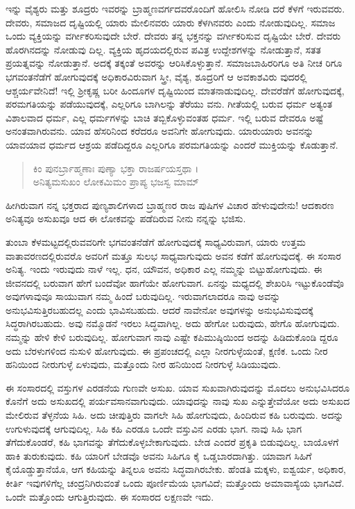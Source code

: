 ಇನ್ನು ವೈಶ್ಯರು ಮತ್ತು ಶೂದ್ರರು ಇವರನ್ನು ಬ್ರಾಹ್ಮಣವರ್ಗದವರೊಂದಿಗೆ ಹೋಲಿಸಿ ನೋಡಿ ದರೆ ಕೆಳಗೆ ಇರುವವರು. ದೇವರು, ಸಮಾಜದ ದೃಷ್ಟಿಯಲ್ಲಿ ಯಾರು ಮೇಲಿನವರು ಯಾರು ಕೆಳಗಿನವರು ಎಂದು ನೋಡುವುದಿಲ್ಲ. ಸಮಾಜ ಒಂದು ವ್ಯಕ್ತಿಯನ್ನು ವರ್ಗೀಕರಿಸುವುದೇ ಬೇರೆ. ದೇವರು ತನ್ನ ಭಕ್ತನನ್ನು ವರ್ಗೀಕರಿಸುವ ದೃಷ್ಟಿಯೇ ಬೇರೆ. ದೇವರು ಹೊರಗಿನದನ್ನು ನೋಡುವು ದಿಲ್ಲ. ವ್ಯಕ್ತಿಯ ಹೃದಯದಲ್ಲಿರುವ ಪವಿತ್ರ ಉದ್ದೇಶಗಳನ್ನು ನೋಡುತ್ತಾನೆ, ಸತತ ಪ್ರಯತ್ನವನ್ನು ನೋಡುತ್ತಾನೆ. ಅದಕ್ಕೆ ತಕ್ಕಂತೆ ಅವರನ್ನು ಆರಿಸಿಕೊಳ್ಳುತ್ತಾನೆ. ಸಮಾಜಬಾಹಿರರಿಗೂ ಅತಿ ನೀಚ ರಿಗೂ ಭಗವಂತನೆಡೆಗೆ ಹೋಗುವುದಕ್ಕೆ ಅಧಿಕಾರವಿರುವಾಗ ಸ್ತ್ರೀ, ವೈಶ್ಯ, ಶೂದ್ರರಿಗೆ ಆ ಅವಕಾಶವಿರು ವುದರಲ್ಲಿ ಆಶ್ಚರ್ಯವೇನಿದೆ! ಇಲ್ಲಿ ಶ್ರೀಕೃಷ್ಣ ಬರೀ ಹಿಂದೂಗಳ ದೃಷ್ಟಿಯಿಂದ ಮಾತನಾಡುವುದಿಲ್ಲ. ದೇವರೆಡೆಗೆ ಹೋಗುವುದಕ್ಕೆ, ಪರಮಗತಿಯನ್ನು ಪಡೆಯುವುದಕ್ಕೆ, ಎಲ್ಲರಿಗೂ ಬಾಗಿಲನ್ನು ತೆರೆಯು ವನು. ಗೀತೆಯಲ್ಲಿ ಬರುವ ಧರ್ಮ ಅತ್ಯಂತ ವಿಶಾಲವಾದ ಧರ್ಮ, ಎಲ್ಲ ಧರ್ಮಗಳನ್ನು ಬಾಚಿ ತಬ್ಬಿಕೊಳ್ಳುವಂತಹ ಧರ್ಮ. ಇಲ್ಲಿ ಬರುವ ದೇವರೂ ಅಷ್ಟೆ ಅನಂತವಾಗಿರುವನು. ಯಾವ ಹೆಸರಿನಿಂದ ಕರೆದರೂ ಅವನಿಗೇ ಹೋಗುವುದು. ಯಾರುಯಾರು ಅವನನ್ನು ಯಾವಯಾವ ಧರ್ಮದ ಆಶ್ರಯ ಪಡೆದಿದ್ದರೂ ಎಲ್ಲರಿಗೂ ಪರಮಗತಿಯನ್ನು ಎಂದರೆ ಮುಕ್ತಿಯನ್ನು ಕೊಡುತ್ತಾನೆ.

\begin{verse}
ಕಿಂ ಪುನರ್ಬ್ರಾಹ್ಮಣಾಃ ಪುಣ್ಯಾ ಭಕ್ತಾ ರಾಜರ್ಷಯಸ್ತಥಾ ।\\ಅನಿತ್ಯಮಸುಖಂ ಲೋಕಮಿಮಂ ಪ್ರಾಪ್ಯ ಭಜಸ್ವ ಮಾಮ್ 
\end{verse}

{\small ಹೀಗಿರುವಾಗ ನನ್ನ ಭಕ್ತರಾದ ಪುಣ್ಯಶಾಲಿಗಳಾದ ಬ್ರಾಹ್ಮಣರ ರಾಜ ಪುಷಿಗಳ ವಿಚಾರ ಹೇಳುವುದೇನು! ಆದಕಾರಣ ಅನಿತ್ಯವೂ ಅಸುಖವೂ ಆದ ಈ ಲೋಕವನ್ನು ಪಡೆದಿರುವ ನೀನು ನನ್ನನ್ನು ಭಜಿಸು.}

ತುಂಬಾ ಕೆಳಮಟ್ಟದಲ್ಲಿರುವವರಿಗೇ ಭಗವಂತನೆಡೆಗೆ ಹೋಗುವುದಕ್ಕೆ ಸಾಧ್ಯವಿರುವಾಗ, ಯಾರು ಉತ್ತಮ ವಾತಾವರಣದಲ್ಲಿರುವರೊ ಅವರಿಗೆ ಮತ್ತೂ ಸುಲಭ ಸಾಧ್ಯವಾಗುವುದು ಅವನ ಕಡೆಗೆ ಹೋಗುವುದಕ್ಕೆ. ಈ ಸಂಸಾರ ಅನಿತ್ಯ. ಇಂದು ಇರುವುದು ನಾಳೆ ಇಲ್ಲ. ಧನ, ಯೌವನ, ಅಧಿಕಾರ ಎಲ್ಲ ನಮ್ಮನ್ನು ಬಿಟ್ಟುಹೋಗುವುದು. ಈ ಜೀವನದಲ್ಲಿ ಬರುವಾಗ ಹೇಗೆ ಬಂದೆವೋ ಹಾಗೆಯೇ ಹೋಗುವಾಗ. ಏನನ್ನು ಮಧ್ಯದಲ್ಲಿ ಶೇಖರಿಸಿ ಇಟ್ಟುಕೊಂಡೆವೊ ಅವುಗಳಾವುವೂ ಸಾಯುವಾಗ ನಮ್ಮ ಹಿಂದೆ ಬರುವುದಿಲ್ಲ. ಇರುವಾಗಲಾದರೂ ನಾವು ಅವನ್ನು ಅನುಭವಿಸುತ್ತಿರಬಹುದಲ್ಲ ಎಂದು ಭಾವಿಸಬಹುದು. ಆದರೆ ನಾವೇನೋ ಅವುಗಳನ್ನು ಅನುಭವಿಸುವುದಕ್ಕೆ ಸಿದ್ಧರಾಗಿರಬಹುದು. ಅವು ನಮ್ಮೊಡನೆ ಇರಲು ಸಿದ್ಧವಾಗಿಲ್ಲ. ಅದು ಹೇಗೋ ಬರುವುದು, ಹೇಗೊ ಹೋಗುವುದು. ನಮ್ಮನ್ನು ಹೇಳಿ ಕೇಳಿ ಬರುವುದಿಲ್ಲ. ಹೋಗುವಾಗ ನಾವು ಎಷ್ಟೇ ಕಪಿಮುಷ್ಠಿಯಿಂದ ಅದನ್ನು ಹಿಡಿದುಕೊಂಡಿ ದ್ದರೂ ಅದು ಬೆರಳುಗಳಿಂದ ನುಸುಳಿ ಹೋಗುವುದು. ಈ ಪ್ರಪಂಚದಲ್ಲಿ ಎಲ್ಲಾ ನೀರಗುಳ್ಳೆಯಂತೆ, ಕ್ಷಣಿಕ. ಒಂದು ನೀರ ಹನಿಯಿಂದ ನೀರುಗುಳ್ಳೆ ಏಳುವುದು, ಮತ್ತೊಂದು ನೀರ ಹನಿಯಿಂದ ನೀರಗುಳ್ಳೆ ಸಿಡಿಯುವುದು.

ಈ ಸಂಸಾರದಲ್ಲಿ ವಸ್ತುಗಳ ಎರಡನೆಯ ಗುಣವೇ ಅಸುಖ. ಯಾವ ಸುಖವಾಗಿರುವುದನ್ನು ಮೊದಲು ಅನುಭವಿಸಿದರೂ ಕೊನೆಗೆ ಅದು ಅಸುಖದಲ್ಲಿ ಪರ್ಯವಸಾನವಾಗುವುದು. ಯಾವುದನ್ನು ನಾವು ಸುಖ ಎನ್ನುತ್ತೇವೆಯೋ ಅದು ಅಸುಖದ ಮೇಲಿರುವ ತೆಳ್ಳನೆಯ ಸಿಹಿ. ಅದು ಚೀಪುತ್ತಿರು ವಾಗಲೇ ಸಿಹಿ ಹೋಗುವುದು, ಹಿಂದಿರುವ ಕಹಿ ಬರುವುದು. ಅದನ್ನು ಉಗುಳುವುದಕ್ಕೆ ಆಗುವುದಿಲ್ಲ. ಸಿಹಿ ಕಹಿ ಎರಡೂ ಒಂದೇ ವಸ್ತುವಿನ ಎರಡು ಭಾಗ. ನಾವು ಸಿಹಿ ಭಾಗ ತೆಗೆದುಕೊಂಡರೆ, ಕಹಿ ಭಾಗವನ್ನು ತೆಗೆದುಕೊಳ್ಳಬೇಕಾಗುವುದು. ಬೇಡ ಎಂದರೆ ಪ್ರಕೃತಿ ಬಿಡುವುದಿಲ್ಲ. ಬಾಯೊಳಗೆ ಹಾಕಿ ತುರುಕುವುದು. ಕಹಿ ಯಾರಿಗೆ ಬೇಡವೊ ಅವನು ಸಿಹಿಗೂ ಕೈ ಒಡ್ಡಬಾರದಾಗಿತ್ತು. ಯಾವಾಗ ಸಿಹಿಗೆ ಕೈಯೊಡ್ಡುತ್ತಾನೆಯೊ, ಆಗ ಕಹಿಯನ್ನು ತಿನ್ನಲೂ ಅವನು ಸಿದ್ಧವಾಗಿರಬೇಕು. ಹೆಂಡತಿ ಮಕ್ಕಳು, ಐಶ್ವರ್ಯ, ಅಧಿಕಾರ, ಕೀರ್ತಿ ಇವುಗಳಿಗೆಲ್ಲ ಚಂದ್ರನಿಗಿರುವಂತೆ ಒಂದು ಪೂರ್ಣಿಮೆಯ ಭಾಗವಿದೆ; ಮತ್ತೊಂದು ಅಮಾವಾಸ್ಯೆಯ ಭಾಗವಿದೆ. ಒಂದೇ ಮತ್ತೊಂದು ಆಗುತ್ತಿರುವುದು. ಈ ಸಂಸಾರದ ಲಕ್ಷಣವೇ ಇದು. 


